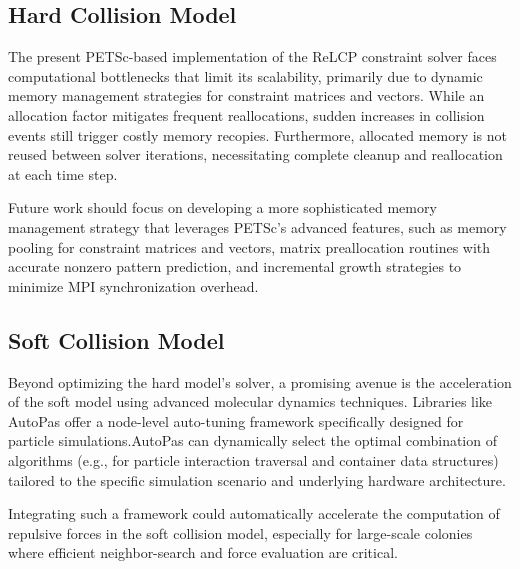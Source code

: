 \documentclass[conference]{IEEEtran}
\begin{document}
\subsection{Hard Collision Model}
The present PETSc-based implementation of the ReLCP constraint solver faces computational bottlenecks that limit its scalability, primarily due to dynamic memory management strategies for constraint matrices and vectors. While an allocation factor mitigates frequent reallocations, sudden increases in collision events still trigger costly memory recopies. Furthermore, allocated memory is not reused between solver iterations, necessitating complete cleanup and reallocation at each time step.

Future work should focus on developing a more sophisticated memory management strategy that leverages PETSc's advanced features, such as memory pooling for constraint matrices and vectors, matrix preallocation routines with accurate nonzero pattern prediction, and incremental growth strategies to minimize MPI synchronization overhead.

\subsection{Soft Collision Model}

Beyond optimizing the hard model's solver, a promising avenue is the acceleration of the soft model using advanced molecular dynamics techniques. Libraries like AutoPas\cite{AutoPasGithub,Gratl2019,Newcome2023} offer a node-level auto-tuning framework specifically designed for particle simulations.AutoPas can dynamically select the optimal combination of algorithms (e.g., for particle interaction traversal and container data structures) tailored to the specific simulation scenario and underlying hardware architecture.

Integrating such a framework could automatically accelerate the computation of repulsive forces in the soft collision model, especially for large-scale colonies where efficient neighbor-search and force evaluation are critical.

\newpage

\balance



\newpage
\tableofcontents
\end{document}
